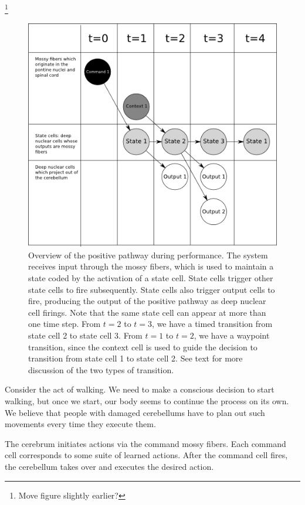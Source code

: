 \documentclass{article}
\theoremstyle{definition}
\begin{document}
\footnote{Move figure slightly earlier?}
\begin{figure}
\includegraphics[width=0.95\linewidth]{positive_overview.png}
\caption{Overview of the positive pathway during performance. The
  system receives input through the mossy fibers, which is used to
  maintain a state coded by the activation of a state cell. State
  cells trigger other state cells to fire subsequently. State cells
  also trigger output cells to fire, producing the output of the
  positive pathway as deep nuclear cell firings. Note that the same
  state cell can appear at more than one time step. From $t=2$ to
  $t=3$, we have a timed transition from state cell 2 to state cell
  3. From $t=1$ to $t=2$, we have a waypoint transition, since the
  context cell is used to guide the decision to transition from state
  cell 1 to state cell 2. See text for more discussion of the two
  types of transition.}
\label{fig-positive-overview}
\end{figure}

Consider the act of walking. We need to make a conscious decision to
start walking, but once we start, our body seems to continue the
process on its own. We believe that people with damaged cerebellums
have to plan out such movements every time they execute them.

The cerebrum initiates actions via the command mossy fibers. Each
command cell corresponds to some suite of learned actions. After the
command cell fires, the cerebellum takes over and executes the desired
action.
\end{document}
